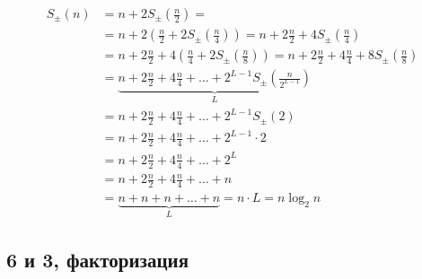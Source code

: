 \begin{align*}
    S_\pm(n)
    & = n + 2 S_\pm\left( \frac{n}{2} \right)  = \\
    & = n + 2 \left( \frac{n}{2} + 2 S_\pm\left( \frac{n}{4} \right) \right)
        = n + 2 \frac{n}{2} + 4 S_\pm\left( \frac{n}{4} \right) \\
    & = n + 2 \frac{n}{2} + 4 \left( \frac{n}{4} + 2 S_\pm\left( \frac{n}{8} \right) \right )
        = n + 2 \frac{n}{2} + 4 \frac{n}{4} + 8 S_\pm\left( \frac{n}{8} \right) \\
    & = \underbrace{n + 2 \frac{n}{2} + 4 \frac{n}{4} + \dots + 2^{L-1} S_\pm \left( \frac{n}{2^{L-1}} \right)}_{L} \\
    & = n + 2 \frac{n}{2} + 4 \frac{n}{4} + \dots + 2^{L-1} S_\pm(2) \\
    & = n + 2 \frac{n}{2} + 4 \frac{n}{4} + \dots + 2^{L-1} \cdot 2 \\
    & = n + 2 \frac{n}{2} + 4 \frac{n}{4} + \dots + 2^L \\
    & = n + 2 \frac{n}{2} + 4 \frac{n}{4} + \dots + n \\
    & = \underbrace{n + n + n + \dots + n}_L
        = n \cdot L
        = n \log_2 n
\end{align*}

\subsection{6 и 3, факторизация}

